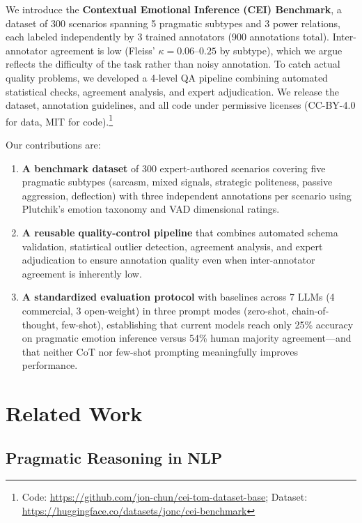 \documentclass[twoside,11pt]{article}
\begin{document}
We introduce the \textbf{Contextual Emotional Inference (CEI) Benchmark}, a dataset of 300 scenarios spanning 5 pragmatic subtypes and 3 power relations, each labeled independently by 3 trained annotators (900 annotations total). Inter-annotator agreement is low (Fleiss' $\kappa = 0.06$--$0.25$ by subtype), which we argue reflects the difficulty of the task rather than noisy annotation. To catch actual quality problems, we developed a 4-level QA pipeline combining automated statistical checks, agreement analysis, and expert adjudication. We release the dataset, annotation guidelines, and all code under permissive licenses (CC-BY-4.0 for data, MIT for code).\footnote{Code: \url{https://github.com/jon-chun/cei-tom-dataset-base}; Dataset: \url{https://huggingface.co/datasets/jonc/cei-benchmark}}

Our contributions are:
\begin{enumerate}[leftmargin=*,noitemsep]
    \item \textbf{A benchmark dataset} of 300 expert-authored scenarios covering five pragmatic subtypes (sarcasm, mixed signals, strategic politeness, passive aggression, deflection) with three independent annotations per scenario using Plutchik's emotion taxonomy and VAD dimensional ratings.
    \item \textbf{A reusable quality-control pipeline} that combines automated schema validation, statistical outlier detection, agreement analysis, and expert adjudication to ensure annotation quality even when inter-annotator agreement is inherently low.
    \item \textbf{A standardized evaluation protocol} with baselines across 7 LLMs (4 commercial, 3 open-weight) in three prompt modes (zero-shot, chain-of-thought, few-shot), establishing that current models reach only 25\% accuracy on pragmatic emotion inference versus 54\% human majority agreement---and that neither CoT nor few-shot prompting meaningfully improves performance.
\end{enumerate}

\section{Related Work}
\label{sec:related}

\subsection{Pragmatic Reasoning in NLP}
\end{document}
